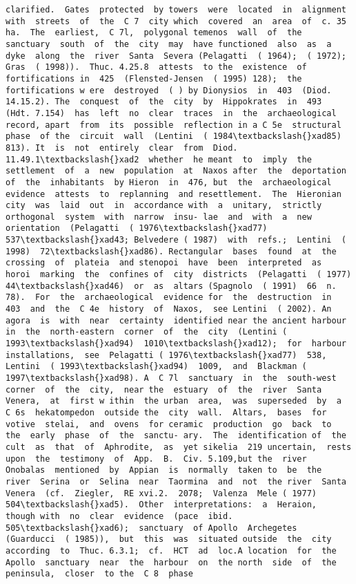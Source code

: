 \documentclass[11pt]{article}
\begin{document}
\begin{Verbatim}[commandchars=\\\{\}]
 clarified.  Gates  protected  by towers  were  located  in  alignment  with  streets  of  the  C 7  city which  covered  an  area  of  c. 35  ha.  The  earliest,  C 7l,  polygonal temenos  wall  of  the  sanctuary  south  of  the  city  may  have functioned  also  as  a  dyke  along  the  river  Santa  Severa (Pelagatti  ( 1964);  ( 1972);  Gras  ( 1998)).  Thuc. 4.25.8  attests  to the  existence  of  fortifications in  425  (Flensted-Jensen  ( 1995) 128);  the  fortifications w ere  destroyed  ( ) by Dionysios  in  403  (Diod. 14.15.2). The  conquest  of  the  city  by  Hippokrates  in  493  (Hdt. 7.154)  has  left  no  clear  traces  in  the  archaeological  record, apart  from  its  possible  reflection in a C 5e  structural  phase  of the  circuit  wall  (Lentini  ( 1984\textbackslash{}xad85)  813). It  is  not  entirely  clear  from  Diod. 11.49.1\textbackslash{}xad2  whether  he meant  to  imply  the  settlement  of  a  new  population  at  Naxos after  the  deportation  of  the  inhabitants  by Hieron  in  476, but  the  archaeological  evidence  attests  to  replanning  and resettlement.  The  Hieronian  city  was  laid  out  in  accordance with  a  unitary,  strictly  orthogonal  system  with  narrow  insu- lae  and  with  a  new  orientation  (Pelagatti  ( 1976\textbackslash{}xad77)  537\textbackslash{}xad43; Belvedere ( 1987)  with  refs.;  Lentini  ( 1998)  72\textbackslash{}xad86). Rectangular  bases  found  at  the  crossing  of  plateia  and stenopoi  have  been  interpreted  as  horoi  marking  the  confines of  city  districts  (Pelagatti  ( 1977)  44\textbackslash{}xad46)  or  as  altars (Spagnolo  ( 1991)  66  n. 78).  For  the  archaeological  evidence for  the  destruction  in  403  and  the  C 4e  history  of  Naxos,  see Lentini  ( 2002). An  agora  is  with  near  certainty  identified near the ancient harbour  in  the  north-eastern  corner  of  the  city  (Lentini ( 1993\textbackslash{}xad94)  1010\textbackslash{}xad12);  for  harbour  installations,  see  Pelagatti ( 1976\textbackslash{}xad77)  538,  Lentini  ( 1993\textbackslash{}xad94)  1009,  and  Blackman ( 1997\textbackslash{}xad98). A  C 7l  sanctuary  in  the  south-west  corner  of  the  city,  near the  estuary  of  the  river  Santa  Venera,  at  first w ithin  the urban  area,  was  superseded  by  a  C 6s  hekatompedon  outside the  city  wall.  Altars,  bases  for  votive  stelai,  and  ovens  for ceramic  production  go  back  to  the  early  phase  of  the  sanctu- ary.  The  identification of  the  cult  as  that  of  Aphrodite,  as  yet sikelia  219 uncertain,  rests  upon  the  testimony  of  App.  B.  Civ. 5.109,but the  river  Onobalas  mentioned  by  Appian  is  normally  taken to  be  the  river  Serina  or  Selina  near  Taormina  and  not  the river  Santa  Venera  (cf.  Ziegler,  RE xvi.2.  2078;  Valenza  Mele ( 1977)  504\textbackslash{}xad5).  Other  interpretations:  a  Heraion,  though with  no  clear  evidence  (pace  ibid. 505\textbackslash{}xad6);  sanctuary  of Apollo  Archegetes  (Guarducci  ( 1985)),  but  this  was  situated outside  the  city  according  to  Thuc. 6.3.1;  cf.  HCT  ad  loc.A location  for  the  Apollo  sanctuary  near  the  harbour  on  the north  side  of  the  peninsula,  closer  to the  C 8  phase  
\end{Verbatim}
\end{document}
